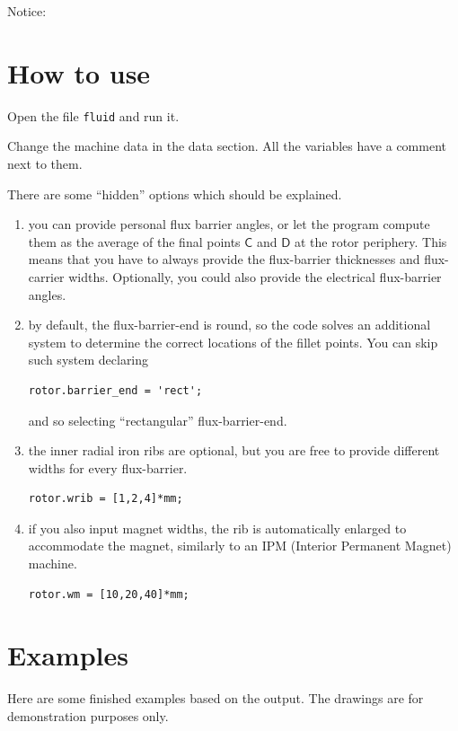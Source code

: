 \documentclass[b5paper,11pt,oneside,fleqn]{article}
\newcommand{\pt}[1]{\mathsf{#1}}
\begin{document}
\vfill
Notice:




\clearpage
\section{How to use}

Open the file \lstinline|fluid| and run it.

Change the machine data in the data section.
All the variables have a comment next to them.

There are some ``hidden'' options which should be explained.
\begin{enumerate}
\item you can provide personal flux barrier angles, or let the program compute 
them as the average of the final points $ \pt{C} $ and $ \pt{D} $ at the rotor 
periphery.
This means that you have to always provide the flux-barrier thicknesses and 
flux-carrier widths.
Optionally, you could also provide the electrical flux-barrier angles.

\item by default, the flux-barrier-end is round, so the code solves an 
additional system to determine the correct locations of the fillet points.
You can skip such system declaring 
\begin{lstlisting}[style=Matlab]
rotor.barrier_end = 'rect';
\end{lstlisting}
and so selecting ``rectangular'' flux-barrier-end.

\item the inner radial iron ribs are optional, but you are free to provide 
different widths for every flux-barrier.
\begin{lstlisting}[style=Matlab]
rotor.wrib = [1,2,4]*mm;
\end{lstlisting}

\item if you also input magnet widths, the rib is automatically enlarged to 
accommodate the magnet, similarly to an IPM (Interior Permanent Magnet) machine.
\begin{lstlisting}[style=Matlab]
rotor.wm = [10,20,40]*mm;
\end{lstlisting}

\end{enumerate}



\clearpage
\section{Examples}
Here are some finished examples based on the output.
The drawings are for demonstration purposes only.
\end{document}
